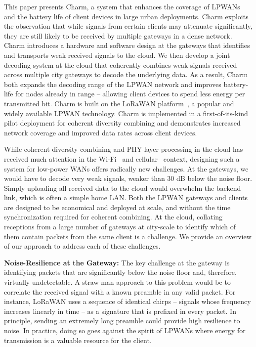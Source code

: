 This paper presents Charm, a system that enhances the coverage of LPWANs and
the battery life of client devices in large urban deployments. Charm exploits
the observation that while signals from certain clients may attenuate
significantly, they are still likely to be received by multiple gateways in a
dense network. Charm introduces a hardware and software design at the gateways
that identifies and transports weak received signals to the cloud. We then
develop a joint decoding system at the cloud that coherently combines weak
signals received across multiple city gateways to decode the underlying data.
As a result, Charm both expands the decoding range of the LPWAN network and
improves battery-life for nodes already in range -- allowing client devices to
spend less energy per transmitted bit. Charm is built on the LoRaWAN
platform~\cite{LoRaWanAlliance2015}, a popular and widely available LPWAN
technology. Charm is implemented in a first-of-its-kind pilot deployment for
coherent diversity combining and demonstrates increased network coverage and
improved data rates across client devices.

While coherent diversity combining and PHY-layer processing in the cloud has
received much attention in the Wi-Fi~\cite{tan2009sam, xie2014scalable} and
cellular~\cite{checko2015cloud, wubben2014benefits} context, designing such a
system for low-power WANs offers radically new challenges. At the gateways, we
would have to decode very weak signals, weaker than 30 dB below the noise
floor. Simply uploading all received data to the cloud would overwhelm
the backend link, which is often  a simple home LAN. Both the LPWAN gateways
and clients are designed to be economical and deployed at scale, and without
the time synchronization required for coherent combining. At the cloud,
collating receptions from a large number of gateways at city-scale to identify
which of them contain packets from the same client is a challenge. We provide
an overview of our approach to address each of these challenges.

\noindent \textbf{Noise-Resilience at the Gateway:} The key challenge at the
gateway is identifying packets that are significantly below the noise floor
and, therefore, virtually undetectable. A straw-man approach to this problem
would be to correlate the received signal with a known preamble in any valid
packet. For instance, LoRaWAN uses a sequence of identical chirps -- signals
whose frequency increases linearly in time -- as a signature that is prefixed
in every packet. In principle, sending an extremely long preamble could
provide high resilience to noise. In practice, doing so goes against the
spirit of LPWANs where energy for transmission is a valuable resource for the
client.

